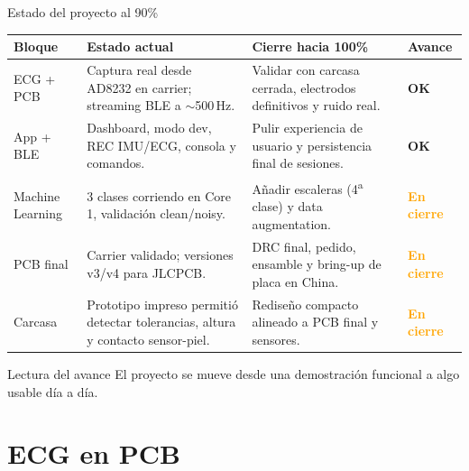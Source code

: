 \documentclass[aspectratio=169, 10pt]{beamer}
\newcommand{\ok}{\textcolor{accent}{\textbf{OK}}}
\newcommand{\warnstate}{\textcolor{orange}{\textbf{En cierre}}}
\begin{document}
\begin{frame}{Estado del proyecto al 90\%}
    \scriptsize
    \centering
    \begin{tabular}{p{2.6cm}p{4.3cm}p{4.3cm}p{1.5cm}}
        \toprule
        \textbf{Bloque} & \textbf{Estado actual} & \textbf{Cierre hacia 100\%} & \textbf{Avance} \\
        \midrule
        ECG + PCB & Captura real desde AD8232 en carrier; streaming BLE a $\sim$500\,Hz. & Validar con carcasa cerrada, electrodos definitivos y ruido real. & \ok \\
        App + BLE & Dashboard, modo dev, REC IMU/ECG, consola y comandos. & Pulir experiencia de usuario y persistencia final de sesiones. & \ok \\
        Machine Learning & 3 clases corriendo en Core 1, validaci\'on clean/noisy. & A\~nadir escaleras (4\textsuperscript{a} clase) y data augmentation. & \warnstate \\
        PCB final & Carrier validado; versiones v3/v4 para JLCPCB. & DRC final, pedido, ensamble y bring-up de placa en China. & \warnstate \\
        Carcasa & Prototipo impreso permiti\'o detectar tolerancias, altura y contacto sensor-piel. & Redise\~no compacto alineado a PCB final y sensores. & \warnstate \\
        \bottomrule
    \end{tabular}
    \vspace{0.35cm}
    \begin{block}{Lectura del avance}
        \scriptsize El proyecto se mueve desde una demostraci\'on funcional a algo usable día a día.
    \end{block}
\end{frame}

\section{ECG en PCB}
\end{document}
